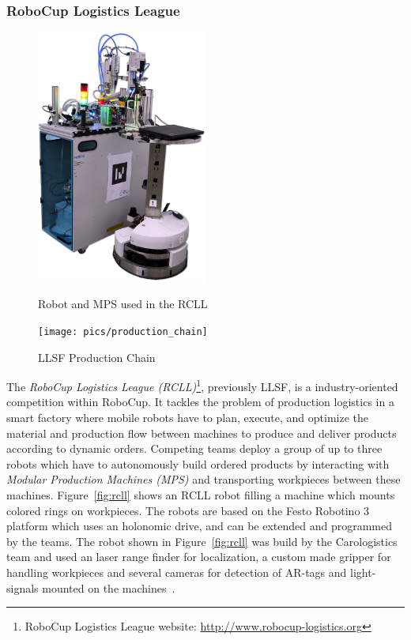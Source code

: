 \documentclass[a4paper,11pt]{article}
\newcommand{\reffig}[1]{Figure~\ref{#1}}
\begin{document}
\subsubsection{RoboCup Logistics League}
\begin{figure}
  \begin{minipage}[b]{0.5\linewidth}
    \centering
    \includegraphics[width=0.5\textwidth]{img/rcll}
    \caption{Robot and MPS used in the RCLL}
    \label{fig:rcll}
  \end{minipage}
\quad
\begin{minipage}[b]{0.5\linewidth}
  \texttt{[image: pics/production\_chain]}
  \caption[LLSF Production Chain]{LLSF Production Chain~\cite{LLSFRules}}
  \label{fig:llsf_chain}
\end{minipage}
\end{figure}

%
The \textit{RoboCup Logistics League (RCLL)}\footnote{RoboCup
  Logistics League website: \url{http://www.robocup-logistics.org}},
previously LLSF, is a industry-oriented competition within RoboCup.
It tackles the problem of production logistics in a smart factory
where mobile robots have to plan, execute, and optimize the material
and production flow between machines to produce and deliver products
according to dynamic orders. Competing teams deploy a group of up to
three robots which have to autonomously build ordered products by
interacting with \textit{Modular Production Machines (MPS)} and
transporting workpieces between these machines.  \reffig{fig:rcll}
shows an RCLL robot filling a machine which mounts colored rings on
workpieces. The robots are based on the Festo Robotino 3 platform
which uses an holonomic drive, and can be extended and programmed by
the teams. The robot shown in \reffig{fig:rcll} was build by the
Carologistics team and used an laser range finder for localization, a
custom made gripper for handling workpieces and several cameras for
detection of AR-tags and light-signals mounted on the
machines~\cite{Carologistics2015}.
\end{document}
